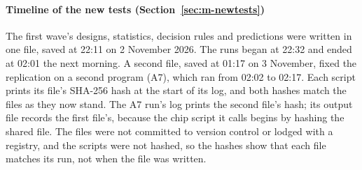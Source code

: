 \paragraph{Timeline of the new tests (Section~\ref{sec:m-newtests})} The first wave's designs, statistics, decision rules and predictions were written in one file, saved at 22:11 on 2 November 2026. The runs began at 22:32 and ended at 02:01 the next morning. A second file, saved at 01:17 on 3 November, fixed the replication on a second program (A7), which ran from 02:02 to 02:17. Each script prints its file's SHA-256 hash at the start of its log, and both hashes match the files as they now stand. The A7 run's log prints the second file's hash; its output file records the first file's, because the chip script it calls begins by hashing the shared file. The files were not committed to version control or lodged with a registry, and the scripts were not hashed, so the hashes show that each file matches its run, not when the file was written.

